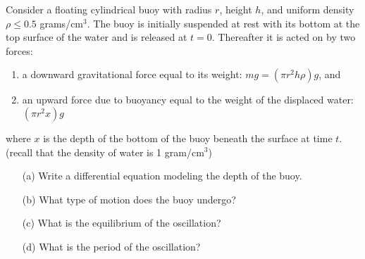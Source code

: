\begin{problem}
\item Consider a floating cylindrical buoy with radius $r$, height $h$, and uniform
    density $\rho \le 0.5$ grams/cm$^3$.  The buoy is initially suspended at rest with
    its bottom at the top surface of the water and is released at $t=0$.  Thereafter
    it is acted on by two forces: 
    \begin{enumerate}
        \item a downward gravitational force equal to its weight: $mg = \left( \pi r^2 h
            \rho \right) g$, and
        \item an upward force due to buoyancy equal to the weight of the displaced water:
            $\left( \pi r^2 x\right) g$
    \end{enumerate}
    where $x$ is the depth of the bottom of the buoy beneath the surface at time $t$.
    (recall that the density of water is 1 gram/cm$^3$)
    \begin{itemize}
        \item[(a)] Write a differential equation modeling the depth of the buoy.
        \item[(b)] What type of motion does the buoy undergo?
        \item[(c)] What is the equilibrium of the oscillation?
        \item[(d)] What is the period of the oscillation?
    \end{itemize}
\end{problem}


